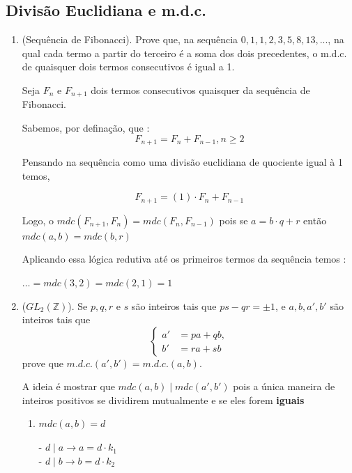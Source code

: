 \subsection{Divisão Euclidiana e m.d.c.}

\begin{enumerate}[label=3.\arabic*.]
    \item (Sequência de Fibonacci). Prove que, na sequência $0,1,1,2,3,5,8,13,...$, na qual 
    cada termo a partir do terceiro é a soma dos dois precedentes, o m.d.c. de quaisquer dois 
    termos consecutivos é igual a 1.
    
    Seja $F_{n}$ e $F_{n+1}$ dois termos consecutivos quaisquer da sequência de Fibonacci.

    Sabemos, por definação, que : 
    \[
        F_{n+1} = F_{n} + F_{n-1}, n \geq 2 
    \]

    Pensando na sequência como uma divisão euclidiana de quociente igual à 1 temos,

    \[
        F_{n+1} = (1) \cdot F_{n} + F_{n-1}
    \]    

    Logo, o $mdc(F_{n+1},F_{n}) = mdc(F_{n},F_{n-1})$ pois se $a = b \cdot q + r$ então $mdc(a,b) = mdc(b,r)$

    Aplicando essa lógica redutiva até os primeiros termos da sequência temos : 

    $ \ldots = mdc(3,2) = mdc(2,1) = 1$

    \item ($GL_2(\mathbb{Z})$). Se $p, q, r$ e $s$ são inteiros tais que $ps - qr = \pm 1$, e 
    $a, b, a', b'$ são inteiros tais que 
    \begin{equation*}
        \left\{
            \begin{aligned}
                a' &= p a + q b,\\
                b' &= r a + s b
            \end{aligned}
        \right.
    \end{equation*}
    prove que $m.d.c.(a', b') = m.d.c.(a, b)$.
    
    A ideia é mostrar que $mdc(a,b) \mid mdc(a',b') $ pois a única maneira de inteiros positivos se dividirem mutualmente e
    se eles forem \textbf{iguais}

    \begin{enumerate}[label=\Roman*.]
        \item $mdc(a,b) = d$
        
        - $d \mid a \rightarrow a = d \cdot k_1 $ \\
        - $d \mid b \rightarrow b = d \cdot k_2 $
        

\end{enumerate}
\end{enumerate}

